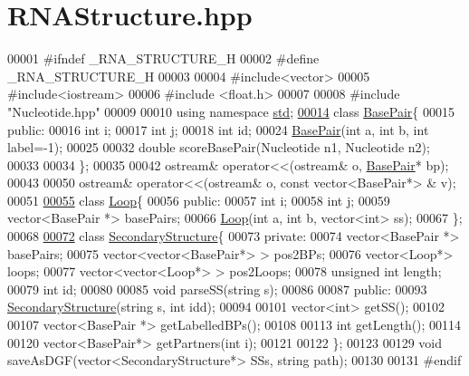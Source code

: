 \hypertarget{_r_n_a_structure_8hpp_source}{}\section{R\+N\+A\+Structure.\+hpp}
\label{_r_n_a_structure_8hpp_source}

\begin{DoxyCode}
00001 \textcolor{preprocessor}{#ifndef \_RNA\_STRUCTURE\_H}
00002 \textcolor{preprocessor}{#define \_RNA\_STRUCTURE\_H}
00003 
00004 \textcolor{preprocessor}{#include<vector>}
00005 \textcolor{preprocessor}{#include<iostream>}
00006 \textcolor{preprocessor}{#include <float.h>}
00007 
00008 \textcolor{preprocessor}{#include "Nucleotide.hpp"}
00009 
00010 \textcolor{keyword}{using namespace }\hyperlink{namespacestd}{std};
\hyperlink{class_base_pair}{00014} \textcolor{keyword}{class }\hyperlink{class_base_pair}{BasePair}\{
00015   \textcolor{keyword}{public}:
00016     \textcolor{keywordtype}{int} i;
00017     \textcolor{keywordtype}{int} j;
00018     \textcolor{keywordtype}{int} id;
00024     \hyperlink{class_base_pair}{BasePair}(\textcolor{keywordtype}{int} a, \textcolor{keywordtype}{int} b, \textcolor{keywordtype}{int} label=-1);
00025 
00032     \textcolor{keywordtype}{double} scoreBasePair(Nucleotide n1, Nucleotide n2);
00033 
00034 \};
00035 
00042 ostream& operator<<(ostream& o, \hyperlink{class_base_pair}{BasePair}* bp);
00043 
00050 ostream& operator<<(ostream& o, const vector<BasePair*> & v);
00051 
\hyperlink{class_loop}{00055} \textcolor{keyword}{class }\hyperlink{class_loop}{Loop}\{
00056   \textcolor{keyword}{public}:
00057     \textcolor{keywordtype}{int} i;
00058     \textcolor{keywordtype}{int} j;
00059     vector<BasePair *> basePairs;
00066     \hyperlink{class_loop}{Loop}(\textcolor{keywordtype}{int} a, \textcolor{keywordtype}{int} b, vector<int> ss);
00067 \};
00068 
\hyperlink{class_secondary_structure}{00072} \textcolor{keyword}{class }\hyperlink{class_secondary_structure}{SecondaryStructure}\{
00073   \textcolor{keyword}{private}:
00074     vector<BasePair *> basePairs;
00075     vector<vector<BasePair*> > pos2BPs;
00076     vector<Loop*> loops;
00077     vector<vector<Loop*> > pos2Loops;
00078     \textcolor{keywordtype}{unsigned} \textcolor{keywordtype}{int} length;
00079     \textcolor{keywordtype}{int} id;
00080 
00085     \textcolor{keywordtype}{void} parseSS(\textcolor{keywordtype}{string} s);
00086 
00087   \textcolor{keyword}{public}:
00093     \hyperlink{class_secondary_structure}{SecondaryStructure}(\textcolor{keywordtype}{string} s, \textcolor{keywordtype}{int} idd);
00094     
00101     vector<int> getSS();
00102     
00107     vector<BasePair *> getLabelledBPs();
00108     
00113     \textcolor{keywordtype}{int} getLength();
00114 
00120     vector<BasePair*> getPartners(\textcolor{keywordtype}{int} i);
00121 
00122 \};
00123 
00129 \textcolor{keywordtype}{void} saveAsDGF(vector<SecondaryStructure*> SSs, \textcolor{keywordtype}{string} path);
00130 
00131 \textcolor{preprocessor}{#endif}
\end{DoxyCode}
